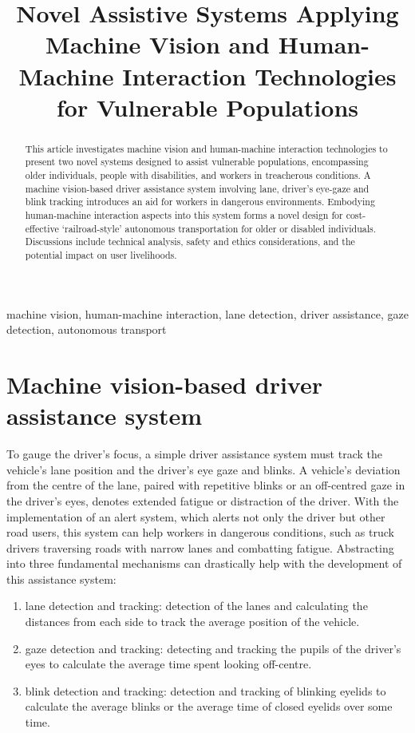\documentclass[9pt,conference]{IEEEtran}
\begin{document}
\title{Novel Assistive Systems Applying Machine Vision and Human-Machine Interaction Technologies for Vulnerable Populations}

\maketitle

\begin{abstract}
    This article investigates machine vision and human-machine interaction technologies to present two novel systems designed to assist vulnerable populations, encompassing older individuals, people with disabilities, and workers in treacherous conditions. A machine vision-based driver assistance system involving lane, driver's eye-gaze and blink tracking introduces an aid for workers in dangerous environments. Embodying human-machine interaction aspects into this system forms a novel design for cost-effective `railroad-style' autonomous transportation for older or disabled individuals. Discussions include technical analysis, safety and ethics considerations, and the potential impact on user livelihoods.
\end{abstract}

\begin{IEEEkeywords}
machine vision, human-machine interaction, lane detection, driver assistance, gaze detection, autonomous transport
\end{IEEEkeywords}

\section{Machine vision-based driver assistance system}
To gauge the driver's focus, a simple driver assistance system must track the vehicle's lane position and the driver's eye gaze and blinks. A vehicle's deviation from the centre of the lane, paired with repetitive blinks or an off-centred gaze in the driver's eyes, denotes extended fatigue or distraction of the driver. With the implementation of an alert system, which alerts not only the driver but other road users, this system can help workers in dangerous conditions, such as truck drivers traversing roads with narrow lanes and combatting fatigue. Abstracting into three fundamental mechanisms can drastically help with the development of this assistance system:

\begin{enumerate}[label=\alph*.]
    \item lane detection and tracking: detection of the lanes and calculating the distances from each side to track the average position of the vehicle.
    \item gaze detection and tracking: detecting and tracking the pupils of the driver's eyes to calculate the average time spent looking off-centre.
    \item blink detection and tracking: detection and tracking of blinking eyelids to calculate the average blinks or the average time of closed eyelids over some time.
\end{enumerate}
\end{document}
